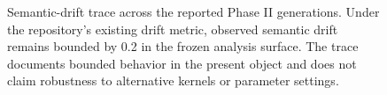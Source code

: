 \begin{figure}[t]
\centering
{}
\caption{Semantic-drift trace across the reported Phase II generations. Under
the repository's existing drift metric, observed semantic drift remains
bounded by 0.2 in the frozen analysis surface. The trace documents bounded
behavior in the present object and does not claim robustness to alternative
kernels or parameter settings.}
\label{fig:drift-over-generations}
\end{figure}
